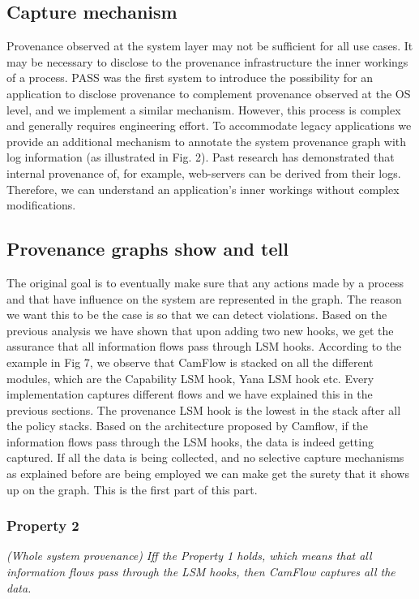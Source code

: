 \subsection{Capture mechanism}
Provenance observed at the system layer may not be sufficient
for all use cases. It may be necessary to disclose to the provenance infrastructure the inner workings of a process. PASS was
the first system to introduce the possibility for an application
to disclose provenance to complement provenance observed at
the OS level, and we implement a similar mechanism. However, this process is complex and generally requires engineering
effort. To accommodate legacy applications we provide an additional
mechanism to annotate the system provenance graph with log
information (as illustrated in Fig. 2). Past research has demonstrated that internal provenance of, for example, web-servers
can be derived from their logs. Therefore, we can understand an application’s inner workings without complex modifications.

\subsection{Provenance graphs show and tell}
The original goal is to eventually make sure that any actions made by a process and that have influence on the system are represented in the graph. The reason we want this to be the case is so that we can detect violations. Based on the previous analysis we have shown that upon adding two new hooks, we get the assurance that all information flows pass through LSM hooks. According to the example in Fig 7, we observe that CamFlow is stacked on all the different modules, which are the Capability LSM hook, Yana LSM hook etc. Every implementation captures different flows and we have explained this in the previous sections. The provenance LSM hook is the lowest in the stack after all the policy stacks. Based on the architecture proposed by Camflow, if the information flows pass through the LSM hooks, the data is indeed getting captured. If all the data is being collected, and no selective capture mechanisms as explained before are being employed we can make get the surety that it shows up on the graph. This is the first part of this part.
\vskip 0.1in
\subsubsection{Property 2}\textit{(Whole system provenance)}
\vskip 0.1in
\textit{Iff the Property 1 holds, which means that all information flows pass through the LSM hooks, then CamFlow captures all the data.} 

